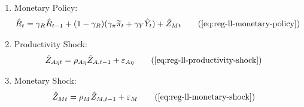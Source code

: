 \documentclass[
	thesis.tex
	]{subfiles}
\begin{document}
{\begin{itemize}
\begin{enumerate}
			\item Monetary Policy:
			\begin{align}
				& \hat{R}_t = \gamma_R \hat{R}_{t-1} + (1-\gamma_R)(\gamma_\pi \widetilde{\pi}_t + \gamma_Y \hat{Y}_t) + \hat{Z}_{Mt} \tag{\ref{eq:reg-ll-monetary-policy}}
			\end{align}
			
			\item Productivity Shock:
			\begin{align}
				\hat{Z}_{A\eta t} &= \rho_{A\eta} \hat{Z}_{A,t-1} + \varepsilon_{A\eta} \tag{\ref{eq:reg-ll-productivity-shock}}
			\end{align}
			
			\item Monetary Shock:
			\begin{align}
				\hat{Z}_{Mt} &= \rho_M \hat{Z}_{M,t-1} + \varepsilon_{M} \tag{\ref{eq:reg-ll-monetary-shock}}
			\end{align}
			
		\end{enumerate}
		
	\end{itemize}
	
} %
\end{document}
